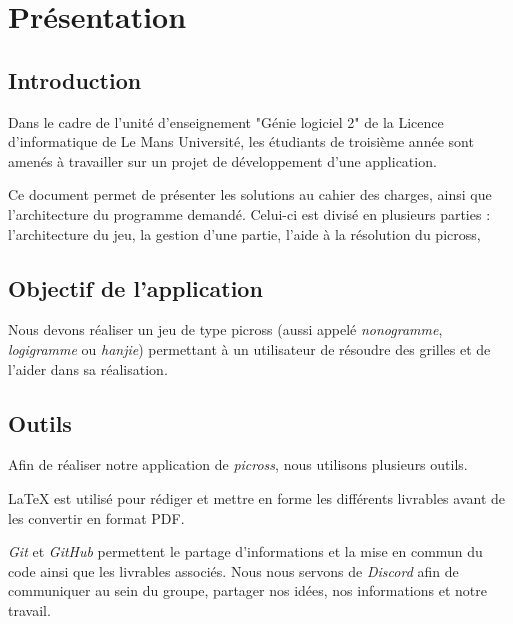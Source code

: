 \documentclass{report}
\begin{document}
\renewcommand{\contentsname}{Sommaire}
\tableofcontents
\thispagestyle{empty}
\thispagestyle{plain}

\chapter{Présentation}
\thispagestyle{empty}
\thispagestyle{plain}

	\section{Introduction}

		Dans le cadre de l'unité d'enseignement "Génie logiciel 2" de la Licence d'informatique de Le Mans Université, les étudiants de troisième année sont amenés à travailler sur un projet de développement d'une application.
		
		Ce document permet de présenter les solutions au cahier des charges, ainsi que l'architecture du programme demandé. Celui-ci est divisé en plusieurs parties : l’architecture du jeu, la gestion d'une partie, l'aide à la résolution du picross, %

	
 	\section{Objectif de l'application}		
		Nous devons réaliser un jeu de type picross (aussi appelé \textit{nonogramme}, \textit{logigramme} ou \textit{hanjie}) permettant à un utilisateur de résoudre des grilles et de l'aider dans sa réalisation.
		
	\section{Outils}
		
		Afin de réaliser notre application de \textit{picross}, nous utilisons plusieurs outils.
		
	LaTeX est utilisé pour rédiger et mettre en forme les différents livrables avant de les convertir en format PDF. 
	
    \textit{Git} et \textit{GitHub} permettent le partage d'informations et la mise en commun du code ainsi que les livrables associés. Nous nous servons de \textit{Discord} afin de communiquer au sein du groupe, partager nos idées, nos informations et notre travail.
\end{document}

